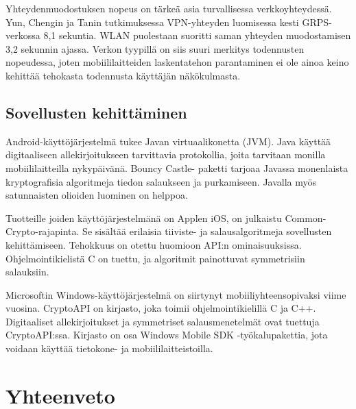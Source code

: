 \documentclass[finnish]{tktltiki2}
\theoremstyle{definition}
\theoremstyle{remark}
\begin{document}
Yhteydenmuodostuksen nopeus on tärkeä asia turvallisessa verkkoyhteydessä. Yun, Chengin ja Tanin \cite{vpn} tutkimuksessa VPN-yhteyden luomisessa kesti GRPS-verkossa 8,1 sekuntia. WLAN puolestaan suoritti saman yhteyden muodostamisen 3,2 sekunnin ajassa. Verkon tyypillä on siis suuri merkitys todennusten nopeudessa, joten mobiililaitteiden laskentatehon parantaminen ei ole ainoa keino kehittää tehokasta todennusta käyttäjän näkökulmasta.   


\subsection{Sovellusten kehittäminen}

Android-käyttöjärjestelmä tukee Javan virtuaalikonetta (JVM). Java käyttää digitaaliseen allekirjoitukseen tarvittavia protokollia, joita tarvitaan monilla mobiililaitteilla nykypäivänä. Bouncy Castle- paketti tarjoaa Javassa monenlaista kryptografisia algoritmeja tiedon salaukseen ja purkamiseen. Javalla myös satunnaisten olioiden luominen on helppoa. \cite{enti}

Tuotteille joiden käyttöjärjestelmänä on Applen iOS, on julkaistu Common-Crypto-rajapinta. Se sisältää erilaisia tiiviste- ja salausalgoritmeja sovellusten kehittämiseen. Tehokkuus on otettu huomioon API:n ominaisuuksissa. Ohjelmointikielistä C on tuettu, ja algoritmit painottuvat symmetrisiin salauksiin. \cite{ios}

Microsoftin Windows-käyttöjärjestelmä on siirtynyt mobiiliyhteensopivaksi viime vuosina. CryptoAPI on kirjasto, joka 	toimii ohjelmointikielillä C ja C++. Digitaaliset allekirjoitukset ja symmetriset salausmenetelmät ovat tuettuja CryptoAPI:ssa.   Kirjasto on osa Windows Mobile SDK -työkalupakettia, jota voidaan käyttää tietokone- ja mobiililaitteistoilla. \cite{windows}
   

\section{Yhteenveto}  
\end{document}
